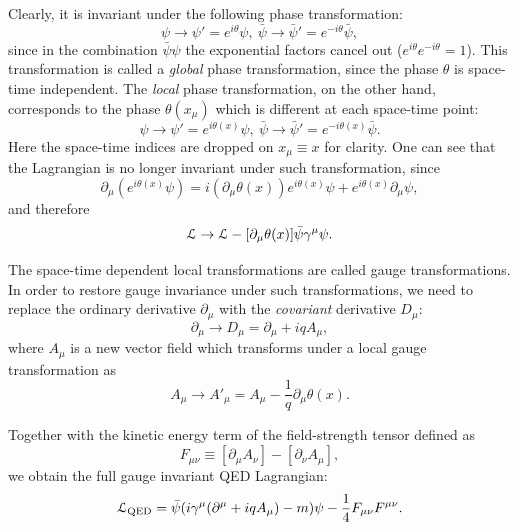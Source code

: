 Clearly, it is invariant under the following phase transformation:
\begin{equation}
\psi \rightarrow \psi' = e^{i \theta} \psi, ~\bar{\psi} \rightarrow \bar{\psi}' = e^{-i \theta} \bar{\psi},
\end{equation}
since in the combination $\bar{\psi}\psi$ the exponential factors cancel out ($e^{i \theta} e^{-i \theta} = 1$). This
transformation is called a \textit{global} phase transformation, since the phase $\theta$ is space-time independent.
The \textit{local} phase transformation, on the other hand, corresponds to the phase $\theta(x_\mu)$ which is
different at each space-time point:
\begin{equation}
\psi \rightarrow \psi' = e^{i \theta(x)} \psi, ~\bar{\psi} \rightarrow \bar{\psi}' = e^{-i \theta(x)} \bar{\psi}.
\end{equation}
Here the space-time indices are dropped on $x_\mu \equiv x$ for clarity. One can see that the Lagrangian is no longer
invariant under such transformation, since
\begin{equation}
\partial_\mu (e^{i \theta(x)} \psi) = i (\partial_\mu \theta(x))  e^{i \theta(x)} \psi + e^{i \theta(x)} \partial_\mu \psi,
\end{equation}
and therefore
\begin{equation}
\mathcal{L} \rightarrow \mathcal{L} - [\partial_\mu \theta(x)] \bar{\psi} \gamma^\mu \psi.
\end{equation}

The space-time dependent local transformations are called gauge transformations. In order to restore gauge invariance
under such transformations, we need to replace the ordinary derivative $\partial_\mu$ with the \textit{covariant}
derivative $D_\mu$:
\begin{equation}
\partial_\mu \rightarrow D_\mu = \partial_\mu + i q A_\mu,
\end{equation}
where $A_\mu$ is a new vector field which transforms under a local gauge transformation as
\begin{equation}
A_\mu \rightarrow A'_\mu = A_\mu - \frac{1}{q} \partial_\mu \theta(x).
\end{equation}

Together with the kinetic energy term of the field-strength tensor defined as
\begin{equation}
\label{eq:F_mu_nu}
F_{\mu\nu} \equiv [\partial_\mu A_\nu] - [\partial_\nu A_\mu],
\end{equation}
we obtain the full gauge invariant QED Lagrangian:
\begin{equation}
\mathcal{L}_\textrm{QED} = \bar{\psi}(i \gamma^\mu (\partial^\mu + i q A_\mu) - m) \psi - \frac{1}{4}F_{\mu\nu} F^{\mu\nu}.
\end{equation}


